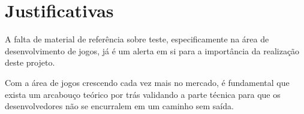 \section{Justificativas}

A falta de material de referência sobre teste, especificamente na área de desenvolvimento de jogos, já é um alerta em si para a importância da realização deste projeto.

Com a área de jogos crescendo cada vez mais no mercado, é fundamental que exista um arcabouço teórico por trás validando a parte técnica para que os desenvolvedores não se encurralem em um caminho sem saída.
